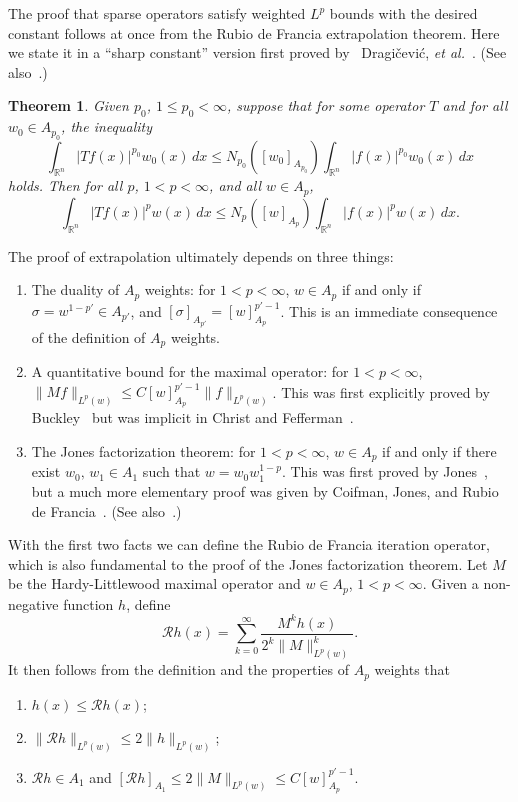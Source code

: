 \documentclass[12pt]{amsart}
\newtheorem{theorem}{Theorem}[section]
\theoremstyle{definition}
\theoremstyle{remark}
\numberwithin{equation}{section}
\newcommand{\rn}{{{\mathbb R}^n}}
\newcommand{\Rdf}{\mathcal{R}}
\begin{document}
The proof that sparse operators satisfy weighted $L^p$ bounds with the
desired constant follows at once from the Rubio de Francia
extrapolation theorem.  Here we state it in a
``sharp constant'' version first proved by~ Dragi\v{c}evi\'{c}, {\em et
  al.}~\cite{MR2140200}.  (See also~\cite{cruz-martell-perezBook}.)

\begin{theorem} \label{thm:rubio}
Given $p_0$, $1\leq p_0<\infty$, suppose that for some operator $T$
and 
for all $w_0\in A_{p_0}$, the inequality
%
\[ \int_\rn |Tf(x)|^{p_0}w_0(x)\,dx
  \leq
  N_{p_0}([w_0]_{A_{p_0}})\int_\rn |f(x)|^{p_0}
w_0(x)\,dx \]
%
holds.  Then for all $p$, $1<p<\infty$,  and all $w\in A_p$, 
%
\[ \int_\rn |Tf(x)|^{p}w(x)\,dx
  \leq
   N_{p}([w]_{A_{p}})\int_\rn |f(x)|^{p}
w(x)\,dx. \]
%
\end{theorem}

The proof of extrapolation ultimately depends on three things:
%
\begin{enumerate}

  \item The duality of $A_p$ weights:  for $1<p<\infty$, $w\in A_p$ if
    and only if $\sigma=w^{1-p'} \in A_{p'}$, and
    $[\sigma]_{A_{p'}}=[w]_{A_p}^{p'-1}$.  This is an immediate
    consequence of the definition of $A_p$ weights.

  \item A quantitative bound for the maximal operator: for
    $1<p<\infty$,
    $ \|Mf\|_{L^p(w)} \leq C[w]_{A_p}^{p'-1}\|f\|_{L^p(w)}$.  This
    was first explicitly proved by Buckley~\cite{buckley93} but was
    implicit in Christ and Fefferman~\cite{MR684636}.

 \item The Jones factorization theorem:  for $1<p<\infty$, $w\in A_p$
   if and only if there exist $w_0,\,w_1 \in A_1$ such that
   $w=w_0w_1^{1-p}$.   This was first proved by Jones~\cite{Jones},
   but a much more elementary proof was given by Coifman, Jones, and
   Rubio de Francia~\cite{MR687639}.  (See also~\cite{dcu-paseky}.)

 \end{enumerate}
 
With the first two facts we can define the Rubio de Francia iteration
operator, which is also fundamental to the proof of the Jones
factorization theorem.  
Let $M$ be  the Hardy-Littlewood maximal operator and $w\in A_p$,
$1<p<\infty$.  Given a
non-negative function $h$,  define
%
\[ \Rdf h(x) = \sum_{k=0}^\infty \frac{M^kh(x)}{2^k
    \|M\|_{L^p(w)}^k}. \]
%
It then follows from the definition and the properties of $A_p$ weights that
%
\begin{enumerate}

\item $h(x) \leq \Rdf h(x)$;

\item $\|\Rdf h\|_{L^p(w)} \leq 2 \| h\|_{L^p(w)}$;

  \item $\Rdf h \in A_1$ and $[\Rdf h]_{A_1} \leq 2\|M\|_{L^p(w)} \leq
    C[w]_{A_p}^{p'-1}$.

  \end{enumerate}
\end{document}
